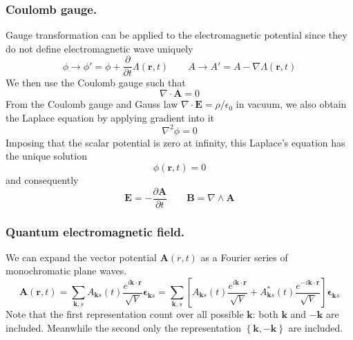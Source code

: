 \documentclass[../../../main.tex]{subfiles}
\begin{document}
\subsubsection{Coulomb gauge.}
Gauge transformation can be applied to the electromagnetic potential since they do not define electromagnetic wave uniquely
\begin{equation*}
  \phi \rightarrow \phi' = \phi + \frac{\partial }{\partial t} \Lambda(\mathbf{r },t)\qquad
  A \rightarrow A' = A - \nabla \Lambda(\mathbf{r },t)
\end{equation*}
We then use the Coulomb gauge such that
\begin{equation*}
  \nabla  \cdot \mathbf{A } =0
\end{equation*}
From the Coulomb gauge and Gauss law $\nabla \cdot \mathbf{E}=\rho/\epsilon_0$ in vacuum, we also obtain the Laplace equation by applying gradient into it
\begin{equation*}
  \nabla ^2 \phi = 0
\end{equation*}
Imposing that the scalar potential is zero at inﬁnity, this Laplace’s equation has the unique solution
\begin{equation*}
  \phi(\mathbf{r},t)=0
\end{equation*}
and consequently
\begin{equation*}
  \mathbf{E} = - \frac{\partial \mathbf{A}}{\partial t} \qquad \mathbf{B} = \nabla \land \mathbf{A}
\end{equation*}

\subsubsection{Quantum electromagnetic field.}
We can expand the vector potential $\mathbf{A}(r, t)$ as a Fourier series of monochromatic plane waves.
\begin{equation*}
  \mathbf{A}(\mathbf{r}, t) = \sum_{\mathbf{k},s} A_{\mathbf{k} s}(t) \frac{e^{i \mathbf{k} \cdot \mathbf{r}}}{\sqrt{V}} \boldsymbol{\epsilon}_{\mathbf{k} s}
  =  \sum_{\mathbf{k},s} \left[ A_{\mathbf{k}s}(t) \frac{e^{i\mathbf{k} \cdot \mathbf{r}}}{\sqrt{V}} + A_{\mathbf{k}s}^*(t) \frac{e^{-i\mathbf{k} \cdot \mathbf{r}}}{\sqrt{V}} \right] \boldsymbol{\epsilon}_{\mathbf{k}s}
\end{equation*}
Note that the first representation count over all possible $\mathbf{k}$: both $\mathbf{k}$ and $-\mathbf{k}$ are included.
Meanwhile the second only the representation $\left\{ \mathbf{k},-\mathbf{k} \right\} $ are included.
\end{document}
